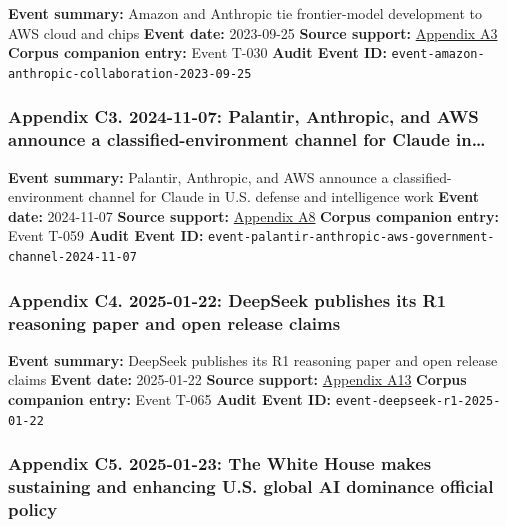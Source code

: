 \documentclass[
  american,
  11pt,
  letterpaper,
]{article}
\begin{document}
\textbf{Event summary:} Amazon and Anthropic tie frontier-model
development to AWS cloud and chips \textbf{Event date:} 2023-09-25
\textbf{Source support:}
\hyperref[appendix-a3-amazon-and-anthropic-announce-strategic-collaboration-to-advance-generative-ai]{Appendix
A3} \textbf{Corpus companion entry:} Event T-030 \textbf{Audit Event
ID:} \texttt{event-amazon-anthropic-collaboration-2023-09-25}

\subsubsection{Appendix C3. 2024-11-07: Palantir, Anthropic, and AWS
announce a classified-environment channel for Claude
in\ldots{}}\label{appendix-c3-2024-11-07-palantir-anthropic-and-aws-announce-a-classified-environment-channel-for-claude-in-u-s-defense-and-intelligence-work}

\textbf{Event summary:} Palantir, Anthropic, and AWS announce a
classified-environment channel for Claude in U.S. defense and
intelligence work \textbf{Event date:} 2024-11-07 \textbf{Source
support:}
\hyperref[appendix-a8-anthropic-and-palantir-partner-to-bring-claude-ai-models-to-aws-for-u-s-government-intelligence-and-defense-operations]{Appendix
A8} \textbf{Corpus companion entry:} Event T-059 \textbf{Audit Event
ID:} \texttt{event-palantir-anthropic-aws-government-channel-2024-11-07}

\subsubsection{Appendix C4. 2025-01-22: DeepSeek publishes its R1
reasoning paper and open release
claims}\label{appendix-c4-2025-01-22-deepseek-publishes-its-r1-reasoning-paper-and-open-release-claims}

\textbf{Event summary:} DeepSeek publishes its R1 reasoning paper and
open release claims \textbf{Event date:} 2025-01-22 \textbf{Source
support:}
\hyperref[appendix-a13-deepseek-r1-incentivizing-reasoning-capability-in-llms-via-reinforcement-learning]{Appendix
A13} \textbf{Corpus companion entry:} Event T-065 \textbf{Audit Event
ID:} \texttt{event-deepseek-r1-2025-01-22}

\subsubsection{Appendix C5. 2025-01-23: The White House makes sustaining
and enhancing U.S. global AI dominance official
policy}\label{appendix-c5-2025-01-23-the-white-house-makes-sustaining-and-enhancing-u-s-global-ai-dominance-official-policy}
\end{document}
